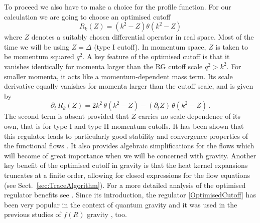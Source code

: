 \documentclass[notitlepage,eqsecnum,bm,amsmath,preprintnumbers,superscriptaddress,nofootinbib,aps,11pt]{revtex4-1}
\begin{document}
To proceed we also have to make a choice for the profile function. For our calculation we are going to choose an optimised cutoff \cite{Litim:2000ci,Litim:2001up,Litim:2001fd,Litim:2006ag} 
\begin{equation}
R_k(Z)=(k^2-Z)\theta(k^2-Z) \label{OptimisedCutoff}
\end{equation}
where $Z$ denotes a suitably chosen differential operator in real space. Most of the time we will be using $Z=\Delta$ (type I cutoff). In momentum space, $Z$ is taken to be  momentum squared $q^2$.  
A key feature of the optimised cutoff is that it vanishes identically for momenta larger than the RG cutoff scale  $q^2>k^2$. For smaller momenta, it acts like a momentum-dependent mass term. Its scale derivative equally vanishes for momenta larger than the cutoff scale, and is given by
\begin{equation}\label {dOpt}
\partial_t\,R_k(Z)=2 k^2\,\theta(k^2-Z) -(\partial_t Z)\,\theta(k^2-Z) \,.
\end{equation}
The second term is absent provided that $Z$ carries no scale-dependence of its own, that is for type I and type II momentum cutoffs. It has been shown that this regulator leads to particularly good stability and convergence properties of 
the functional flows \cite{Litim:2000ci,Litim:2001fd}.  It also provides algebraic simplifications for the flows which will become 
of great importance when we will be concerned with gravity. Another key benefit of the optimised cutoff in gravity is that the  heat kernel expansions truncates at a finite order, allowing for closed expressions for the flow equations (see Sect.~\ref{sec:TraceAlgorithm}).  For a more detailed analysis of the optimised regulator benefits see 
\cite{Litim:2007jb,Litim:2010tt}. 
Since its introduction, 
the regulator \eqref{OptimisedCutoff} has been very popular in the context of quantum gravity and it was used in the previous studies of $f(R)$ 
gravity \cite{Codello:2007bd,Machado:2007ea}, too. 
\end{document}
